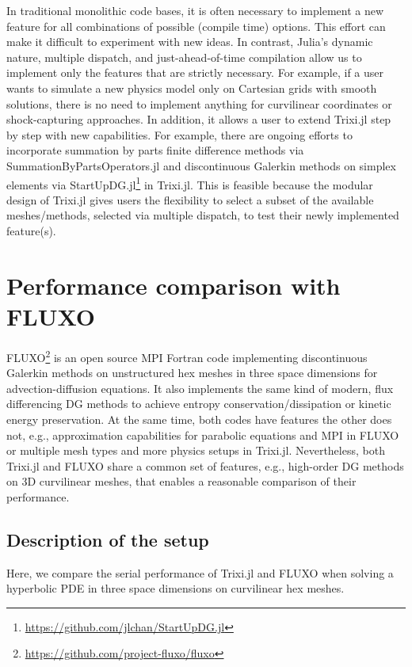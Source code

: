 \documentclass[hidelinks]{juliacon} %
\makeatletter
\newcommand{\eg}[0]{{e.g.\@}\xspace}
\newcommand{\trixi}{Trixi.jl\xspace}
\makeatother
\begin{document}
In traditional monolithic code bases, it is often necessary to implement a new
feature for all combinations of possible (compile time) options. This effort
can make it difficult to experiment with new ideas. In contrast, Julia's dynamic
nature, multiple dispatch, and just-ahead-of-time compilation allow us to implement only the features
that are strictly necessary. For example, if a user wants to simulate a new
physics model only on Cartesian grids with smooth solutions, there is no need
to implement anything for curvilinear coordinates or shock-capturing approaches.
In addition, it allows a user to extend \trixi step by step with new capabilities.
For example, there are ongoing efforts to incorporate summation by parts finite
difference methods via SummationByPartsOperators.jl \cite{ranocha2021sbp} and
discontinuous Galerkin methods on simplex elements via StartUpDG.jl\footnote{\url{https://github.com/jlchan/StartUpDG.jl}} in \trixi.
This is feasible because the modular design of \trixi gives users the flexibility to select
a subset of the available meshes/methods, selected via multiple dispatch,
to test their newly implemented feature(s).



\section{Performance comparison with FLUXO}
\label{sec:performance-comparison}

FLUXO\footnote{\url{https://github.com/project-fluxo/fluxo}} is an open source
MPI Fortran code implementing discontinuous Galerkin methods on unstructured hex
meshes in three space dimensions for advection-diffusion equations. It also
implements the same kind of modern, flux differencing DG methods
to achieve entropy conservation/dissipation or kinetic energy preservation.
At the same time, both codes have features the other does not, \eg,
approximation capabilities for parabolic equations and MPI in FLUXO
or multiple mesh types and more physics setups in \trixi. Nevertheless,
both \trixi and FLUXO share a common set of features, \eg, high-order DG
methods on 3D curvilinear meshes, that enables a reasonable comparison of their performance.


\subsection{Description of the setup}

Here, we compare the serial performance of \trixi and FLUXO when solving a
hyperbolic PDE in three space dimensions on curvilinear hex meshes.
\end{document}
